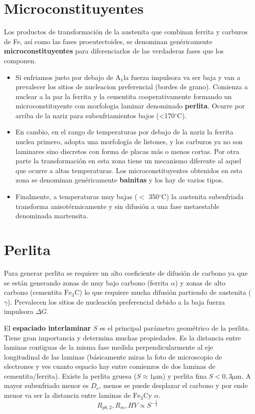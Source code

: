 \documentclass{article}
\newcommand{\Aone}{A\ensuremath{_{1}}}
\newcommand{\grad}{\ensuremath{^\circ \mathrm{C}}}
\newcommand{\cementita}{\ensuremath{\mathrm{Fe}_3 \mathrm{C}}}
\begin{document}
\section{Microconstituyentes}
Los productos de transformación de la austenita que combinan
ferrita y carburos de Fe, así como las fases proeutectoides, se denominan genéricamente \textbf{microconstituyentes} para diferenciarlos de las verdaderas fases que los componen.
\begin{itemize}
    \item Si enfriamos justo por debajo de \Aone la fuerza impulsora va ser baja  y van a prevalecer los sitios de nucleacion preferencial (bordes de grano). Comienza a nuclear a la par la ferrita y la cementita cooperativamente formando un microconstituyente con morfologia laminar denominado \textbf{perlita}. Ocurre por arriba de la nariz para subenfriamientos bajos (<170\grad).
    \item En cambio, en el rango de temperaturas por debajo de la nariz la ferrita nuclea primero, adopta una morfología de listones, y los carburos ya no son laminares sino discretos con forma de placas más o menos cortas. Por otra parte la transformación en esta zona tiene un mecanismo diferente al aquel que ocurre a altas temperaturas. Los microconstituyentes obtenidos en esta zona se denominan genéricamente \textbf{bainitas} y los hay de varios tipos.
    \item Finalmente, a temperaturas muy bajas ($<$ 350\grad) la austenita subenfriada transforma anisotérmicamente y sin difusión a una fase metaestable denominada martensita.
\end{itemize}


\section{Perlita}
Para generar perlita se requiere un alto coeficiente de difusión de carbono ya que se están generando zonas de muy bajo carbono (ferrita $\alpha$) y zonas de alto carbono (cementita $\cementita$) lo que requiere mucha difusión partiendo de austenita ($\gamma$). Prevalecen los sitios de nucleación preferencial debido a la baja fuerza impulsora $\Delta G$.

El \textbf{espaciado interlaminar} $S$ es el principal parámetro geométrico de la perlita. Tiene gran importancia y determina muchas propiedades. Es la distancia entre laminas contiguas de la misma fase medida perpendicularmente al eje longitudinal de las laminas (básicamente miras la foto de microscopio de electrones y ves cuanto espacio hay entre comienzos de dos laminas de cementita/ferrita). Existe la perlita gruesa ($S\approx 1\si{\micro \meter}$) y perlita fina $S< 0,3\si{\micro \meter}$. A mayor subenfriado menor es $D_c$, menos se puede desplazar el carbono y por ende menor va ser la distancia entre laminas de \cementita y $\alpha$.
\begin{equation}\label{eq:StoPerliteStrength}
    R_{p 0,2}, R_{m}, H V \propto S^{-\frac{1}{2}}
\end{equation}
\end{document}
